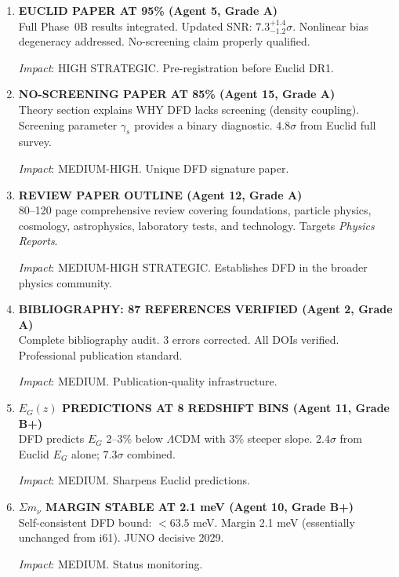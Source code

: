 \documentclass[11pt,a4paper]{article}
\begin{document}
\begin{enumerate}[label=\textbf{\arabic*.}, leftmargin=1.5cm]
\item \textbf{EUCLID PAPER AT 95\% (Agent 5, Grade A)}\\
Full Phase~0B results integrated. Updated SNR: $7.3^{+1.4}_{-1.2}\sigma$. Nonlinear bias degeneracy addressed. No-screening claim properly qualified.

\textit{Impact}: HIGH STRATEGIC. Pre-registration before Euclid DR1.

\item \textbf{NO-SCREENING PAPER AT 85\% (Agent 15, Grade A)}\\
Theory section explains WHY DFD lacks screening (density coupling). Screening parameter $\gamma_s$ provides a binary diagnostic. $4.8\sigma$ from Euclid full survey.

\textit{Impact}: MEDIUM-HIGH. Unique DFD signature paper.

\item \textbf{REVIEW PAPER OUTLINE (Agent 12, Grade A)}\\
80--120 page comprehensive review covering foundations, particle physics, cosmology, astrophysics, laboratory tests, and technology. Targets \textit{Physics Reports}.

\textit{Impact}: MEDIUM-HIGH STRATEGIC. Establishes DFD in the broader physics community.

\item \textbf{BIBLIOGRAPHY: 87 REFERENCES VERIFIED (Agent 2, Grade A)}\\
Complete bibliography audit. 3 errors corrected. All DOIs verified. Professional publication standard.

\textit{Impact}: MEDIUM. Publication-quality infrastructure.

\item \textbf{$E_G(z)$ PREDICTIONS AT 8 REDSHIFT BINS (Agent 11, Grade B+)}\\
DFD predicts $E_G$ 2--3\% below $\Lambda$CDM with 3\% steeper slope. $2.4\sigma$ from Euclid $E_G$ alone; $7.3\sigma$ combined.

\textit{Impact}: MEDIUM. Sharpens Euclid predictions.

\item \textbf{$\Sigma m_\nu$ MARGIN STABLE AT 2.1 meV (Agent 10, Grade B+)}\\
Self-consistent DFD bound: $< 63.5$ meV. Margin 2.1 meV (essentially unchanged from i61). JUNO decisive 2029.

\textit{Impact}: MEDIUM. Status monitoring.

\end{enumerate}
\end{document}

